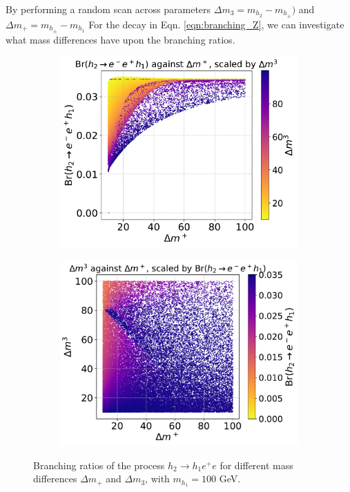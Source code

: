 \documentclass[12pt]{article}
\begin{document}
By performing a random scan across parameters $\Delta m_3 = m_{h_2} - m_{h_\pm})$ and $\Delta m_+ = m_{h_\pm} - m_{h_1}$ For the decay in Eqn. \ref{eqn:branching_Z}, we can investigate what mass differences have upon the branching ratios.
\begin{figure}[H]
    \centering
    \begin{subfigure}[b]{0.49\textwidth}
        \centering
        \includegraphics[width=\textwidth]{branching_ratio_plots/Br__h_2__rightarrow_e_-_e___h_1____Delta_m____scale___Delta_m_3_.pdf}
        \caption{}
        \label{fig:Br(h2ee),Dm3_scale}
    \end{subfigure}
    \hfill
    \begin{subfigure}[b]{0.49\textwidth}
        \centering
        \includegraphics[width=\textwidth]{branching_ratio_plots/__Delta_m_3___Delta_m____scale_Br__h_2__rightarrow_e_-_e___h_1__.pdf}
        \caption{}
        \label{fig:Br(h2ee),Br_scale}
    \end{subfigure}
    \caption{Branching ratios of the process $h_2 \rightarrow h_1 e^+e$ for different mass differences $\Delta m_+$ and $\Delta m_3$, with $m_{h_1} =100$ GeV.}
    \label{fig:Br(h2ee)}
\end{figure}
\end{document}

